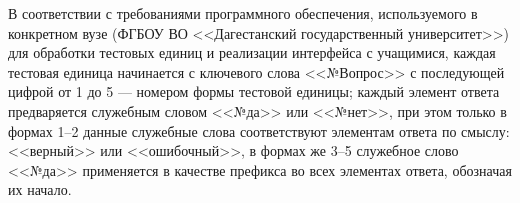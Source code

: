 В соответствии с требованиями программного обеспечения, используемого в конкретном вузе (ФГБОУ ВО <<Дагестанский государственный университет>>) для обработки тестовых единиц и реализации интерфейса с учащимися, каждая тестовая единица начинается с ключевого слова <<№Вопрос>> с последующей цифрой от 1 до 5 --- номером формы тестовой единицы; каждый элемент ответа предваряется служебным словом <<№да>> или <<№нет>>, при этом только в формах 1--2 данные служебные слова соответствуют элементам ответа по смыслу: <<верный>> или <<ошибочный>>, в формах же 3--5 служебное слово <<№да>> применяется в качестве префикса во всех элементах ответа, обозначая их начало.








%
%
